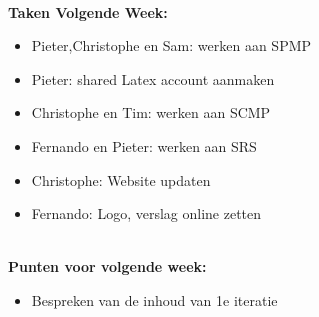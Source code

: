 \mbox{} 
\\
\noindent \textbf{Taken Volgende Week:}\\
\begin{itemize}
	\item Pieter,Christophe en Sam: werken aan SPMP
	\item Pieter: shared Latex account aanmaken
	\item Christophe en Tim: werken aan SCMP 
	\item Fernando en Pieter: werken aan SRS
	\item Christophe: Website updaten
	\item Fernando: Logo, verslag online zetten
\end{itemize}
\mbox{} 
\\
\noindent \textbf{Punten voor volgende week:}\\
\begin{itemize}
	\item Bespreken van de inhoud van 1e iteratie
\end{itemize}
